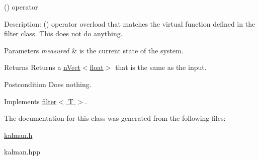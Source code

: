 () operator 

Description\+: () operator overload that matches the virtual function defined in the filter class. This does not do anything. 
\begin{DoxyParams}{Parameters}
{\em measured} & is the current state of the system. \\
\hline
\end{DoxyParams}
\begin{DoxyReturn}{Returns}
Returns a \hyperlink{classnVect}{n\+Vect$<$float$>$} that is the same as the input. 
\end{DoxyReturn}
\begin{DoxyPostcond}{Postcondition}
Does nothing. 
\end{DoxyPostcond}


Implements \hyperlink{classfilter_ac8ec0fb4a10d10ee5e3133259610e0d2}{filter$<$ T $>$}.



The documentation for this class was generated from the following files\+:\begin{DoxyCompactItemize}
\item 
\hyperlink{kalman_8h}{kalman.\+h}\item 
kalman.\+hpp\end{DoxyCompactItemize}

